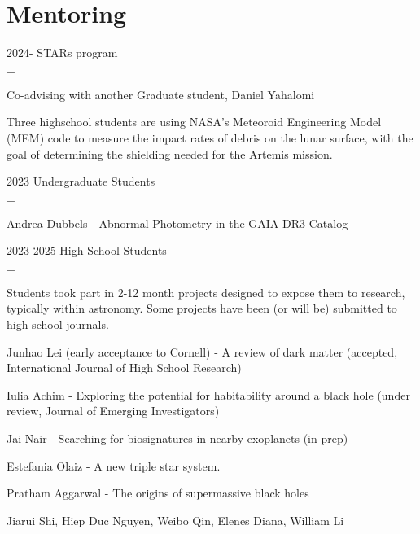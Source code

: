 \documentclass[]{scoggins-cv} %
\begin{document}
  \section{Mentoring}
      \begin{entrylist}
  \entry
  {2024-}
    {STARs program}
    {}
  {%
\vspace{-1em}
\begin{list}{{\color{numcolor}$-$}}{\cvlist}
\item Co-advising with another Graduate student, Daniel Yahalomi
\item Three highschool students are using NASA's Meteoroid Engineering Model (MEM) code to measure
 the impact rates of debris on the lunar surface,
 with the goal of determining the shielding needed for the Artemis mission.

\end{list}
  }

	    \entry
	    {2023}
	      {Undergraduate Students}
	      {}
	    {%
		\vspace{-1em}
		\begin{list}{{\color{numcolor}$-$}}{\cvlist}
		\item Andrea Dubbels - Abnormal Photometry in the GAIA DR3 Catalog

		\end{list}
	    }
	    \entry
	    {2023-2025}
	      {High School Students}
	      {}
	    {%
		\vspace{-1em}
		\begin{list}{{\color{numcolor}$-$}}{\cvlist}
		\item Students took part in 2-12 month projects designed to expose them to research, typically within astronomy. Some projects have been (or will be) submitted to high school journals.
		    \item Junhao Lei (early acceptance to Cornell) - A review of dark matter (accepted, International Journal of High School Research)
		    \item Iulia Achim - Exploring the potential for habitability around a black hole (under review, Journal of Emerging Investigators)
        \item Jai Nair - Searching for biosignatures in nearby exoplanets (in prep)
        \item Estefania Olaiz - A new triple star system.
		    \item Pratham Aggarwal - The origins of supermassive black holes
		    \item Jiarui Shi, Hiep Duc Nguyen, Weibo Qin, Elenes Diana, William Li

		\end{list}
	    }


      \end{entrylist}
\end{document}
